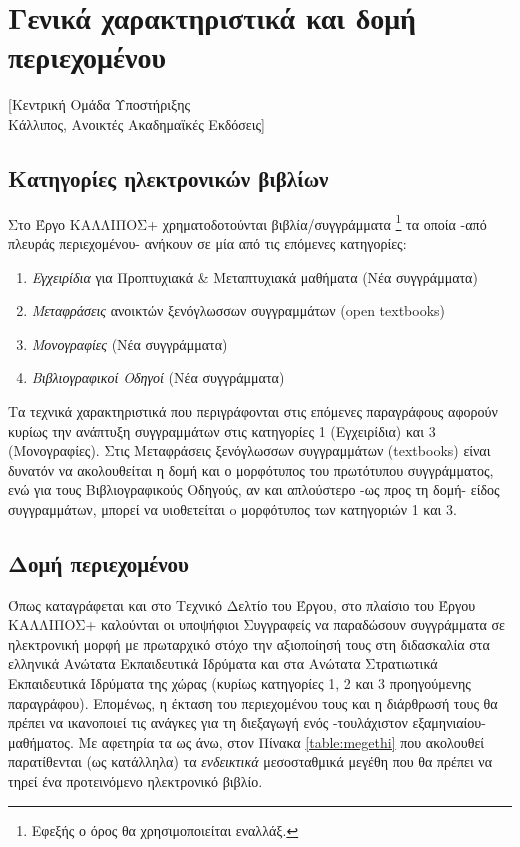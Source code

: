 \chapter{Γενικά χαρακτηριστικά και δομή περιεχομένου}\label{chap:character}
[Κεντρική Ομάδα Υποστήριξης \\ Κάλλιπος, Ανοικτές Ακαδημαϊκές Εκδόσεις]
\section{Κατηγορίες ηλεκτρονικών βιβλίων }
Στο Έργο ΚΑΛΛΙΠΟΣ+ χρηματοδοτούνται βιβλία/συγγράμματα \footnote{Εφεξής ο όρος θα χρησιμοποιείται εναλλάξ.} τα οποία -από πλευράς
περιεχομένου- ανήκουν σε μία από τις επόμενες κατηγορίες:
\begin{enumerate}
\item \emph{Εγχειρίδια} για Προπτυχιακά \& Μεταπτυχιακά μαθήματα (Νέα συγγράμματα)
\item \emph{Μεταφράσεις} ανοικτών ξενόγλωσσων συγγραμμάτων (open textbooks)
\item \emph{Μονογραφίες} (Νέα συγγράμματα)
\item \emph{Βιβλιογραφικοί Οδηγοί} (Νέα συγγράμματα)
\end{enumerate}

Τα τεχνικά χαρακτηριστικά  που περιγράφονται στις επόμενες παραγράφους αφορούν
κυρίως την ανάπτυξη συγγραμμάτων στις κατηγορίες 1 (Εγχειρίδια) και 3 (Μονογραφίες).
Στις Mεταφράσεις ξενόγλωσσων συγγραμμάτων (textbooks) είναι δυνατόν να ακολουθείται
η δομή και ο μορφότυπος του πρωτότυπου συγγράμματος, ενώ για τους Βιβλιογραφικούς
Οδηγούς, αν και απλούστερο -ως προς τη δομή- είδος συγγραμμάτων, μπορεί να υιοθετείται
o μορφότυπος των κατηγοριών 1 και 3.

\section{Δομή περιεχομένου}
Όπως  καταγράφεται  και  στο  Τεχνικό  Δελτίο  του  Έργου,  στο  πλαίσιο  του  Έργου
ΚΑΛΛΙΠΟΣ+  καλούνται  οι  υποψήφιοι  Συγγραφείς  να  παραδώσουν  συγγράμματα  σε
ηλεκτρονική μορφή με πρωταρχικό  στόχο την αξιοποίησή τους στη διδασκαλία  στα
ελληνικά  Ανώτατα  Εκπαιδευτικά  Ιδρύματα και  στα  Ανώτατα  Στρατιωτικά
Εκπαιδευτικά  Ιδρύματα  της  χώρας  (κυρίως  κατηγορίες  1,  2 και  3  προηγούμενης
παραγράφου). Επομένως, η έκταση του περιεχομένου τους και η διάρθρωσή τους θα πρέπει
να ικανοποιεί τις ανάγκες για τη διεξαγωγή ενός -τουλάχιστον εξαμηνιαίου-  μαθήματος.
Με αφετηρία τα ως άνω, στον Πίνακα \ref{table:megethi} που ακολουθεί παρατίθενται (ως κατάλληλα) τα
\emph{ενδεικτικά} μεσοσταθμικά μεγέθη που θα πρέπει να τηρεί ένα προτεινόμενο ηλεκτρονικό
βιβλίο.

